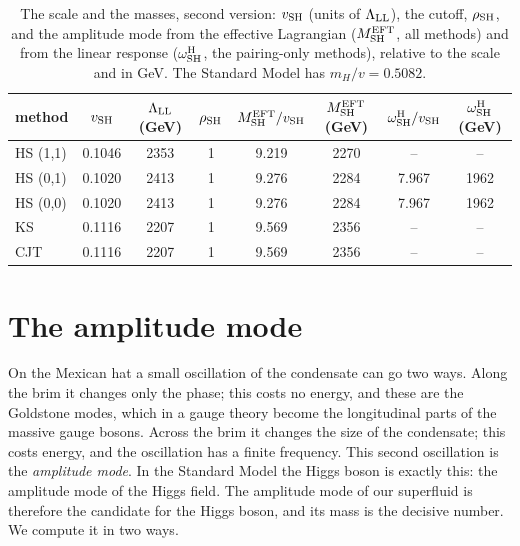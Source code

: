 \documentclass[aps,prd,twocolumn,superscriptaddress,nofootinbib,floatfix,longbibliography]{revtex4-2}
\newcommand{\LL}{{\rm LL}}
\newcommand{\SH}{{\rm SH}}
\begin{document}
\begin{table}[t]
\caption{The scale and the masses, second version: $v_\SH$ (units of $\Lambda_\LL$), the cutoff, $\rho_\SH$, and the
amplitude mode from the effective Lagrangian ($M^{\rm EFT}_\SH$, all methods) and from the linear response
($\omega^{\rm H}_\SH$, the pairing-only methods), relative to the scale and in GeV. The Standard Model has
$m_H/v=0.5082$.}
\label{tab:masses}
\begin{ruledtabular}
\begin{tabular}{lccccccc}
method & $v_\SH$ & $\Lambda_\LL$ (GeV) & $\rho_\SH$ & $M^{\rm EFT}_\SH/v_\SH$ & $M^{\rm EFT}_\SH$ (GeV) & $\omega^{\rm H}_\SH/v_\SH$ & $\omega^{\rm H}_\SH$ (GeV)\\
\hline
HS (1,1) & 0.1046 & 2353 & 1 & 9.219 & 2270 & -- & --\\
HS (0,1) & 0.1020 & 2413 & 1 & 9.276 & 2284 & 7.967 & 1962\\
HS (0,0) & 0.1020 & 2413 & 1 & 9.276 & 2284 & 7.967 & 1962\\
KS & 0.1116 & 2207 & 1 & 9.569 & 2356 & -- & --\\
CJT & 0.1116 & 2207 & 1 & 9.569 & 2356 & -- & --\\
\end{tabular}
\end{ruledtabular}
\end{table}

\section{The amplitude mode}
\label{sec:amplitude}

On the Mexican hat a small oscillation of the condensate can go two ways. Along the brim it changes only the phase; this
costs no energy, and these are the Goldstone modes, which in a gauge theory become the longitudinal parts of the massive
gauge bosons. Across the brim it changes the size of the condensate; this costs energy, and the oscillation has a finite
frequency. This second oscillation is the \emph{amplitude mode}. In the Standard Model the Higgs boson is exactly this:
the amplitude mode of the Higgs field. The amplitude mode of our superfluid is therefore the candidate for the Higgs
boson, and its mass is the decisive number. We compute it in two ways.
\end{document}
